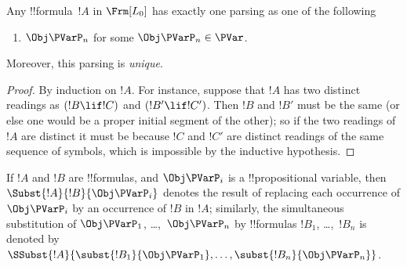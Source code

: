 \documentclass[../../../include/open-logic-section]{subfiles}
\begin{document}
\begin{prop}
Any !!{formula}~$!A$ in $ \Frm[L_0]$ has exactly one parsing as one of
the following
\begin{enumerate}


\item $\Obj \PVarP_n$ for some $\Obj \PVarP_n \in  \PVar$.
  




\end{enumerate}
Moreover, this parsing is \emph{unique}.
\end{prop}

\begin{proof}
By induction on $!A$. For instance, suppose that $!A$ has two distinct
readings as $(!B \lif !C)$ and $(!B' \lif !C')$. Then $!B$ and $!B'$
must be the same (or else one would be a proper initial segment of the
other); so if the two readings of $!A$ are distinct it must be because
$!C$ and $!C'$ are distinct readings of the same sequence of symbols,
which is impossible by the inductive hypothesis.
\end{proof}


\begin{defn}
If $!A$ and $!B$ are !!{formula}s, and $\Obj \PVarP_i$ is a !!{propositional
variable}, then $\Subst{!A}{!B}{\Obj \PVarP_i}$ denotes the result of
replacing each occurrence of $\Obj \PVarP_i$ by an occurrence of $!B$ in $!A$;
similarly, the simultaneous substitution of $\Obj \PVarP_1$, \dots,~$\Obj \PVarP_n$ by
!!{formula}s $!B_1$, \dots,~$!B_n$ is denoted by
$\SSubst{!A}{\subst{!B_1}{\Obj \PVarP_1},\dots,\subst{!B_n}{\Obj \PVarP_n}}$.
\end{defn}
\end{document}
